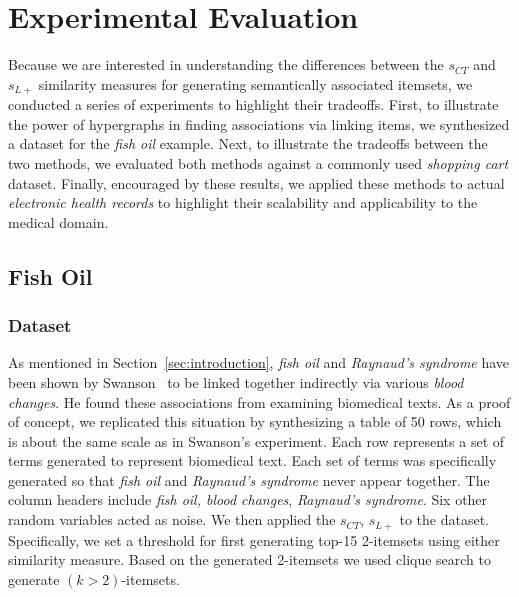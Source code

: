 \section{Experimental Evaluation}
\label{experiment}
Because we are interested in understanding the differences between the $s_{CT}$ and $s_{L+}$ similarity measures for generating semantically associated itemsets, we conducted a series of experiments to highlight their tradeoffs.  First, to illustrate the power of hypergraphs in finding associations via linking items, we synthesized a dataset for the \emph{fish oil} example.  Next, to illustrate the tradeoffs between the two methods, we evaluated both methods against a commonly used \emph{shopping cart} dataset.  Finally, encouraged by these results, we applied these methods to actual \emph{electronic health records} to highlight their scalability and applicability to the medical domain.


\subsection{Fish Oil}
\subsubsection{Dataset}
As mentioned in Section~\ref{sec:introduction}, \emph{fish oil} and \emph{Raynaud's syndrome} have been shown by Swanson~\cite{swanson87} to be linked together indirectly via various \emph{blood changes}.  He found these associations from examining biomedical texts.  As a proof of concept, we replicated this situation by synthesizing a table of 50 rows, which is about the same scale as in Swanson's experiment.  Each row represents a set of terms generated to represent biomedical text.   Each set of terms was specifically generated so that \emph{fish oil} and \emph{Raynaud's syndrome} never appear together. The column headers include \emph{fish oil, blood changes}, \emph{Raynaud's syndrome}.  Six other random variables acted as noise.  We then applied the $s_{CT}$, $s_{L+}$ to the dataset. Specifically, we set a threshold for first generating top-15 2-itemsets using either similarity measure. Based on the generated 2-itemsets we used clique search to generate $(k>2)$-itemsets.

